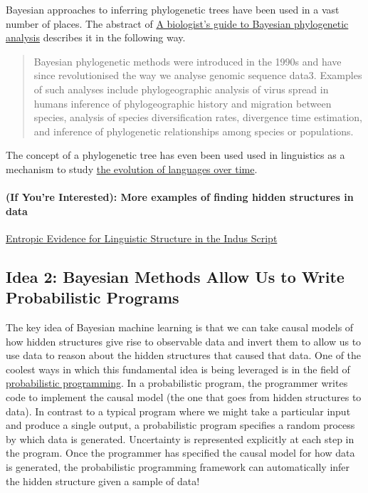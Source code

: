 \documentclass[assignment01_Solutions]{subfiles}
\begin{document}
Bayesian approaches to inferring phylogenetic trees have been used in a vast number of places.  The abstract of \href{https://www.ncbi.nlm.nih.gov/pmc/articles/PMC5624502/}{A biologist’s guide to Bayesian phylogenetic analysis} describes it in the following way.
\begin{quote}
Bayesian phylogenetic methods were introduced in the 1990s and have since revolutionised the way we analyse genomic sequence data3. Examples of such analyses include phylogeographic analysis of virus spread in humans inference of phylogeographic history and migration between species, analysis of species diversification rates, divergence time estimation, and inference of phylogenetic relationships among species or populations.
\end{quote}

The concept of a phylogenetic tree has even been used used in linguistics as a mechanism to study \href{https://journals.plos.org/plosone/article?id=10.1371/journal.pone.0180908}{the evolution of languages over time}.

\paragraph{(If You're Interested): More examples of finding hidden structures in data}

\href{https://homes.cs.washington.edu/~rao/ScienceIndus.pdf}{Entropic Evidence for Linguistic Structure in the Indus Script}

\subsection*{Idea 2: Bayesian Methods Allow Us to Write Probabilistic Programs}

The key idea of Bayesian machine learning is that we can take causal models of how hidden structures give rise to observable data and invert them to allow us to use data to reason about the hidden structures that caused that data.  One of the coolest ways in which this fundamental idea is being leveraged is in the field of \href{https://en.wikipedia.org/wiki/Probabilistic_programming}{probabilistic programming}.  In a probabilistic program, the programmer writes code to implement the causal model (the one that goes from hidden structures to data).  In contrast to a typical program where we might take a particular input and produce a single output, a probabilistic program specifies a random process by which data is generated.  Uncertainty is represented explicitly at each step in the program.  Once the programmer has specified the causal model for how data is generated, the probabilistic programming framework can automatically infer the hidden structure given a sample of data!
\end{document}
